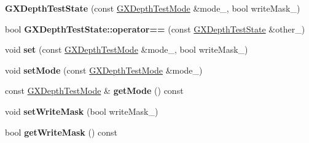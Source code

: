 \begin{DoxyCompactItemize}
\item 
{\bfseries G\+X\+Depth\+Test\+State} (const \hyperlink{class_i_dream_sky_1_1_g_x_depth_test_mode}{G\+X\+Depth\+Test\+Mode} \&mode\+\_\+, bool write\+Mask\+\_\+)\hypertarget{class_i_dream_sky_1_1_g_x_depth_test_state_a2ac80c10958fe4a9f08b53c4547a52a1}{}\label{class_i_dream_sky_1_1_g_x_depth_test_state_a2ac80c10958fe4a9f08b53c4547a52a1}

\item 
bool {\bfseries G\+X\+Depth\+Test\+State\+::operator==} (const \hyperlink{class_i_dream_sky_1_1_g_x_depth_test_state}{G\+X\+Depth\+Test\+State} \&other\+\_\+)\hypertarget{class_i_dream_sky_1_1_g_x_depth_test_state_a9a128a5e2e4a0ce2840e7e04726cb16d}{}\label{class_i_dream_sky_1_1_g_x_depth_test_state_a9a128a5e2e4a0ce2840e7e04726cb16d}

\item 
void {\bfseries set} (const \hyperlink{class_i_dream_sky_1_1_g_x_depth_test_mode}{G\+X\+Depth\+Test\+Mode} \&mode\+\_\+, bool write\+Mask\+\_\+)\hypertarget{class_i_dream_sky_1_1_g_x_depth_test_state_a27d6fa8ff47ae0e3895ab0d7a064387a}{}\label{class_i_dream_sky_1_1_g_x_depth_test_state_a27d6fa8ff47ae0e3895ab0d7a064387a}

\item 
void {\bfseries set\+Mode} (const \hyperlink{class_i_dream_sky_1_1_g_x_depth_test_mode}{G\+X\+Depth\+Test\+Mode} \&mode\+\_\+)\hypertarget{class_i_dream_sky_1_1_g_x_depth_test_state_ae8dcb9c07190b2af0be49b8967828dab}{}\label{class_i_dream_sky_1_1_g_x_depth_test_state_ae8dcb9c07190b2af0be49b8967828dab}

\item 
const \hyperlink{class_i_dream_sky_1_1_g_x_depth_test_mode}{G\+X\+Depth\+Test\+Mode} \& {\bfseries get\+Mode} () const \hypertarget{class_i_dream_sky_1_1_g_x_depth_test_state_a345fda43bc7bc9fcae1d74a05cab0f02}{}\label{class_i_dream_sky_1_1_g_x_depth_test_state_a345fda43bc7bc9fcae1d74a05cab0f02}

\item 
void {\bfseries set\+Write\+Mask} (bool write\+Mask\+\_\+)\hypertarget{class_i_dream_sky_1_1_g_x_depth_test_state_ad84edcaae1f4f76a65047df3736d112b}{}\label{class_i_dream_sky_1_1_g_x_depth_test_state_ad84edcaae1f4f76a65047df3736d112b}

\item 
bool {\bfseries get\+Write\+Mask} () const \hypertarget{class_i_dream_sky_1_1_g_x_depth_test_state_a95e4832c137f3e35c0e32bddc14a9df6}{}\label{class_i_dream_sky_1_1_g_x_depth_test_state_a95e4832c137f3e35c0e32bddc14a9df6}

\end{DoxyCompactItemize}


